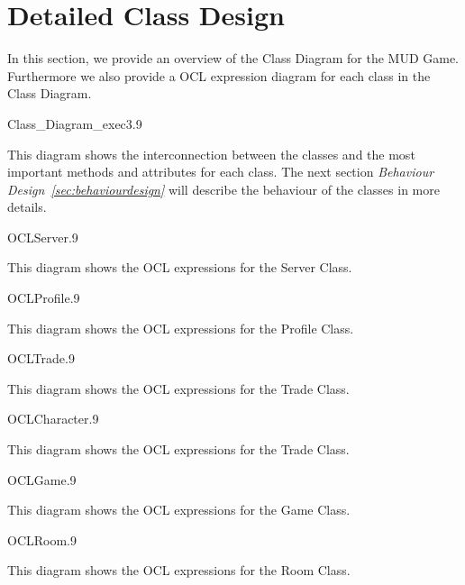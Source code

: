 \section{Detailed Class Design}
\label{sec:detailedclassdesign}
In this section, we provide an overview of the Class Diagram for the MUD Game. Furthermore we also provide a OCL expression diagram for each class in the Class Diagram.

\begin{myfigure}{Class_Diagram_exec3}{.9}%
	\caption{Class Diagram of the MUD game}
	\label{fig:class-design}
\end{myfigure}

This diagram shows the interconnection between the classes and the most important methods and attributes for each class. The next section \emph{Behaviour Design~\ref{sec:behaviourdesign}} will describe the behaviour of the classes in more details.

\begin{myfigure}{OCLServer}{.9}%
	\caption{Server Class with OCL Expressions}
	\label{fig:class-design}
\end{myfigure}

This diagram shows the OCL expressions for the Server Class. 

\begin{myfigure}{OCLProfile}{.9}%
	\caption{Profile Class with OCL Expressions}
	\label{fig:class-design}
\end{myfigure}

This diagram shows the OCL expressions for the Profile Class.

\begin{myfigure}{OCLTrade}{.9}%
	\caption{Trade Class with OCL Expressions}
	\label{fig:class-design}
\end{myfigure}

This diagram shows the OCL expressions for the Trade Class.

\begin{myfigure}{OCLCharacter}{.9}%
	\caption{Character Class with OCL Expressions}
	\label{fig:class-design}
\end{myfigure}

This diagram shows the OCL expressions for the Trade Class.

\begin{myfigure}{OCLGame}{.9}%
	\caption{Game Class with OCL Expressions}
	\label{fig:class-design}
\end{myfigure}

This diagram shows the OCL expressions for the Game Class.

\begin{myfigure}{OCLRoom}{.9}%
	\caption{Room Class with OCL Expressions}
	\label{fig:class-design}
\end{myfigure}

This diagram shows the OCL expressions for the Room Class.
\newpage